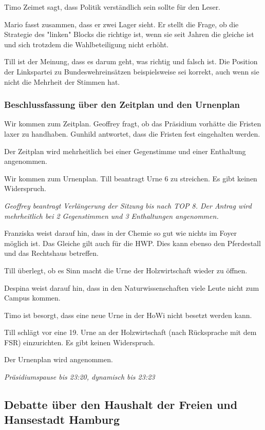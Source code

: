 \documentclass[ngerman,headheight=70pt]{scrartcl}
\begin{document}
    Timo Zeimet sagt, dass Politik verständlich sein sollte für den Leser.

    Mario fasst zusammen, dass er zwei Lager sieht. Er stellt die Frage, ob
    die Strategie des "linken" Blocks die richtige ist, wenn sie seit Jahren die
    gleiche ist und sich trotzdem die Wahlbeteiligung nicht erhöht.

    Till ist der Meinung, dass es darum geht, was richtig und falsch ist. Die Position
    der Linkspartei zu Bundeswehreinsätzen beispielsweise sei korrekt, auch wenn
    sie nicht die Mehrheit der Stimmen hat.

    \subsubsection{Beschlussfassung über den Zeitplan und den Urnenplan}

    Wir kommen zum Zeitplan. Geoffrey fragt, ob das Präsidium vorhätte die Fristen
    laxer zu handhaben. Gunhild antwortet, dass die Fristen fest eingehalten werden.

    Der Zeitplan wird mehrheitlich bei einer Gegenstimme und einer Enthaltung
    angenommen.

    Wir kommen zum Urnenplan. Till beantragt Urne 6 zu streichen. Es gibt keinen
    Widerspruch.

    \textit{Geoffrey beantragt Verlängerung der Sitzung bis nach TOP 8. Der Antrag
    wird mehrheitlich bei 2 Gegenstimmen und 3 Enthaltungen angenommen.}

    Franziska weist darauf hin, dass in der Chemie so gut wie nichts im Foyer
    möglich ist. Das Gleiche gilt auch für die HWP. Dies kann ebenso den
    Pferdestall und das Rechtshaus betreffen.

    Till überlegt, ob es Sinn macht die Urne der Holzwirtschaft wieder zu öffnen.

    Despina weist darauf hin, dass in den Naturwissenschaften viele Leute nicht
    zum Campus kommen.

    Timo ist besorgt, dass eine neue Urne in der HoWi nicht besetzt werden kann.

    Till schlägt vor eine 19. Urne an der Holzwirtschaft (nach Rücksprache mit
    dem FSR) einzurichten. Es gibt keinen Widerspruch.

    Der Urnenplan wird angenommen.

    \textit{Präsidiumspause bis 23:20, dynamisch bis 23:23}

    \subsection{Debatte über den Haushalt der Freien und Hansestadt Hamburg}
\end{document}
